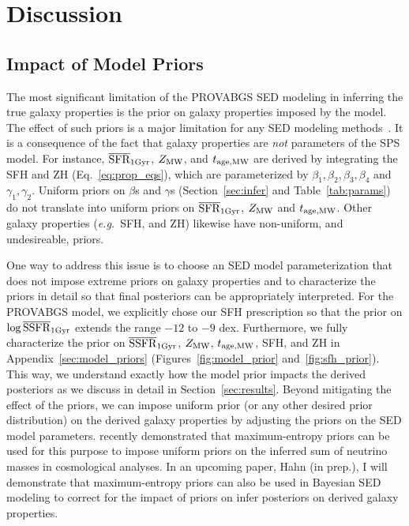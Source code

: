 \section{Discussion} \label{sec:discuss}
\subsection{Impact of Model Priors}
The most significant limitation of the {\sc PROVABGS} SED modeling in
inferring the true galaxy properties is the prior on galaxy properties imposed
by the model. 
The effect of such priors is  a major limitation for any SED modeling
methods~\citep[\emph{e.g.}][]{carnall2017, leja2019}. 
It is a consequence of the fact that galaxy properties are \emph{not}
parameters of the SPS model.
For instance, $\overline{\rm SFR}_{\rm 1Gyr}$, $Z_{\rm MW}$, and $t_{\rm age, MW}$ are derived by integrating the SFH
and ZH (Eq.~\ref{eq:prop_eqs}), which are parameterized by $\beta_1, \beta_2,
\beta_3, \beta_4$ and $\gamma_1, \gamma_2$. 
Uniform priors on $\beta$s and $\gamma$s (Section~\ref{sec:infer} and
Table~\ref{tab:params}) do not translate into uniform priors on $\overline{\rm SFR}_{\rm 1Gyr}$,
$Z_{\rm MW}$ and $t_{\rm age, MW}$.
Other galaxy properties (\emph{e.g.}~SFH, and ZH) likewise have
non-uniform, and undesireable, priors. 

One way to address this issue is to choose an SED model parameterization that
does not impose extreme priors on galaxy properties and to characterize the
priors in detail so that final posteriors can be appropriately interpreted. 
For the {\sc PROVABGS} model, we explicitly chose our SFH prescription so that
the prior on $\log\overline{\rm SSFR}_{\rm 1Gyr}$ extends the range $-12$ to $-9$ dex.
Furthermore, we fully characterize the prior on $\overline{\rm SSFR}_{\rm 1Gyr}$, $Z_{\rm MW}$, $t_{\rm age, MW}$,
SFH, and ZH in Appendix~\ref{sec:model_priors} (Figures~\ref{fig:model_prior}
and~\ref{fig:sfh_prior}). 
This way, we understand exactly how the model prior impacts the derived
posteriors as we discuss in detail in Section~\ref{sec:results}. 
Beyond mitigating the effect of the priors, we can impose uniform prior (or any
other desired prior distribution) on the derived galaxy properties by adjusting
the priors on the SED model parameters. 
\cite{handley2019} recently demonstrated that maximum-entropy priors can be
used for this purpose to impose uniform priors on the inferred sum of neutrino
masses in cosmological analyses. 
In an upcoming paper, Hahn (in prep.), I will demonstrate that maximum-entropy
priors can also be used in Bayesian SED modeling to correct for the impact of
priors on infer posteriors on derived galaxy properties. 


